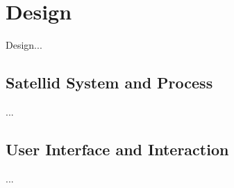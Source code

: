 \section{Design}
\label{sec:design}

Design...

\subsection{Satellid System and Process}

...

\subsection{User Interface and Interaction}

...

